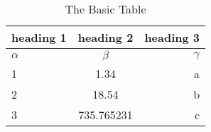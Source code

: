 \begin{table}[h!]  
\begin{center}  
\caption{The Basic Table}  
\label{tab:Table1}  
\begin{tabular}{|l|c|r|}\hline  
\textbf{heading 1} & \textbf{heading 2} & \textbf{heading 3}\\\hline  
$\alpha$ & $\beta$ & $\gamma$ \\  
\hline  
1 & 1.34 & a\\\hline  
2 & 18.54 & b\\\hline  
3 & 735.765231 & c\\\hline   
\end{tabular}  
\end{center}  
\end{table}  





